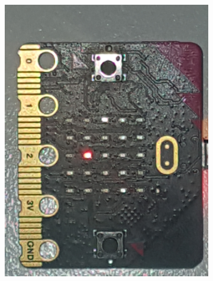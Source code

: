 \begin{figure}[h!]
\begin{subfigure}[b]{0.19\textwidth}
             \includegraphics[width=.98\linewidth]{figuren/matrix/mVier}
       \end{subfigure}	
      \begin{subfigure}[b]{0.19\textwidth}

\end{subfigure}
\end{figure}
